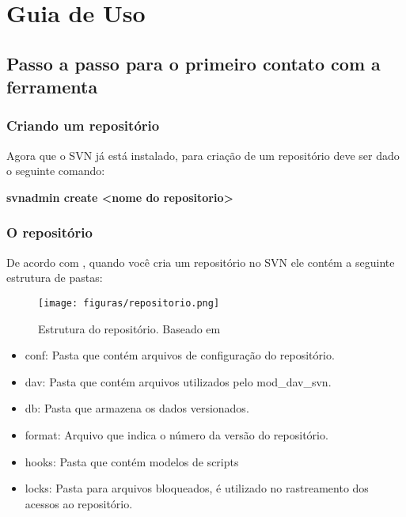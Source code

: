 \chapter[Guia de Uso]{Guia de Uso}

\section{Passo a passo para o primeiro contato com a ferramenta}

\subsection{Criando um repositório}

Agora que o SVN já está instalado, para criação de um repositório deve ser dado o seguinte comando:

\begin{centering}

\colorbox{PineGreen}{
\begin{minipage}{250px}
  \textbf{svnadmin create <nome do repositorio>}

\end{minipage}
}
\end{centering}

\subsection{O repositório}

De acordo com \cite{svn-book}, quando você cria um repositório no SVN ele contém a seguinte estrutura de pastas:

\begin{figure}[!htb]
\centering
\texttt{[image: figuras/repositorio.png]}
\caption{Estrutura do repositório. Baseado em \cite{svn-book}}
\end{figure}


\begin{itemize}

\item conf: Pasta que contém arquivos de configuração do repositório.

\item dav: Pasta que contém arquivos utilizados pelo mod\_dav\_svn.

\item db: Pasta que armazena os dados versionados.

\item format: Arquivo que indica o número da versão do repositório.

\item hooks: Pasta que contém modelos de scripts

\item locks: Pasta para arquivos bloqueados, é utilizado no rastreamento dos acessos ao repositório.

\end{itemize}


